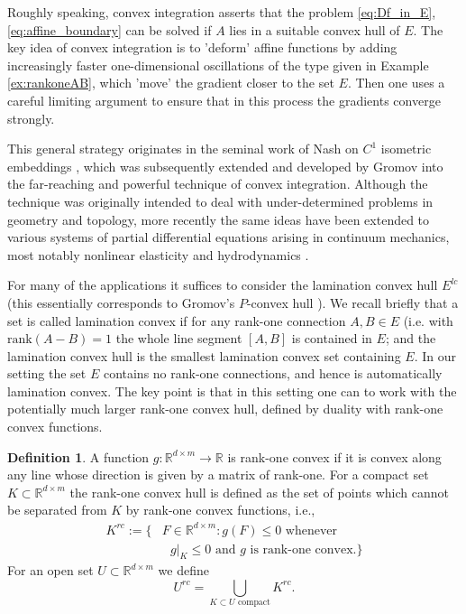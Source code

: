 \documentclass[titlepage]{amsart}
\numberwithin{equation}{section}
\theoremstyle{plain}
\theoremstyle{definition}
\newtheorem{definition}[equation]{Definition}
\theoremstyle{remark}
\newcommand{\R}{\mathbb{R}}
\begin{document}
Roughly speaking, convex integration asserts that the problem \eqref{eq:Df_in_E},  \eqref{eq:affine_boundary}
can be solved if $A$ lies in a suitable convex hull of  $E$. 
The key idea of convex integration is to 'deform' affine functions by adding 
increasingly faster one-dimensional oscillations of the type given in Example \ref{ex:rankoneAB}, which 'move' the gradient closer to the set $E$. Then one uses a careful limiting argument to ensure that in this process the gradients converge 
strongly.

This general strategy originates in the seminal work of Nash on $C^1$ isometric embeddings \cite{nash54}, 
which was subsequently extended and developed by 
Gromov \cite{gromov_pdr} into the far-reaching and powerful technique 
of convex integration. 
Although the technique was originally intended to deal with under-determined problems
 in geometry and topology, more recently the same
  ideas have been extended to various systems of partial differential equations arising 
  in continuum mechanics, most notably nonlinear
   elasticity \cite{Kirchheim:2002wc} and hydrodynamics \cite{SzekelyhidiJr:2014tu,delellis_szekelyhidi16,Buckmaster:2019et}. 

For many of the applications it suffices to consider the lamination convex hull $E^{lc}$ 
(this essentially corresponds to Gromov's $P$-convex hull \cite{gromov_pdr}). 
We recall briefly that a set is called lamination convex if for 
any rank-one connection  $A,B\in E$ (i.e. with $\textrm{rank}(A-B)=1$ the whole line segment $[A,B]$ is contained in $E$; 
and the lamination convex hull is the smallest lamination convex set containing $E$. 
In our setting the
 set $E$ contains no rank-one connections,  and hence is automatically lamination convex.
 The key point is that in this setting  one can to work with the potentially much larger
 rank-one convex hull,  defined by duality with rank-one convex functions.  



\begin{definition}  \label{de:rc} A function $g: \R^{d \times m} \to \R$ is rank-one convex if it is convex along any line whose
direction is given by a matrix of rank-one. 
For a compact set $K \subset \R^{d \times m}$ the rank-one convex hull is defined as the set of points
which cannot be separated from $K$ by rank-one convex functions, i.e.,
\begin{align}  K^{rc} := \{& F \in \R^{d \times m} :  
\text{$g(F) \le 0$ whenever} \\   & \text{ $g|_K \le 0$ and $g$ is  rank-one convex.} \} \nonumber 
\end{align}
For an open set $U \subset \R^{d \times m}$ we define
\begin{equation}
U^{rc} = \bigcup_{\text{$K \subset U$ compact}}  K^{rc}.
\end{equation}
\end{definition}
\end{document}
